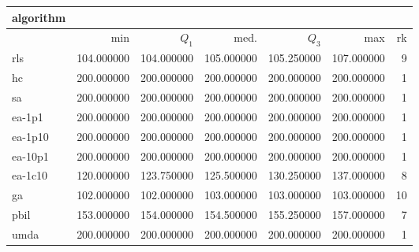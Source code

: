 \begin{tabular}{@{}l*{5}{>{{}}N{3}{0}}>{{}}N{2}{0}@{}}
\toprule
{algorithm} &  \\
\midrule
& {min} & {$Q_1$} & {med.} & {$Q_3$} & {max} & {rk}\\
\midrule
rls & 104.000000 & 104.000000 & 105.000000 & 105.250000 & 107.000000 & 9\\
hc & {\color{blue}} 200.000000 & {\color{blue}} 200.000000 & {\color{blue}} 200.000000 & {\color{blue}} 200.000000 & {\color{blue}} 200.000000 & 1\\
sa & {\color{blue}} 200.000000 & {\color{blue}} 200.000000 & {\color{blue}} 200.000000 & {\color{blue}} 200.000000 & {\color{blue}} 200.000000 & 1\\
ea-1p1 & {\color{blue}} 200.000000 & {\color{blue}} 200.000000 & {\color{blue}} 200.000000 & {\color{blue}} 200.000000 & {\color{blue}} 200.000000 & 1\\
ea-1p10 & {\color{blue}} 200.000000 & {\color{blue}} 200.000000 & {\color{blue}} 200.000000 & {\color{blue}} 200.000000 & {\color{blue}} 200.000000 & 1\\
ea-10p1 & {\color{blue}} 200.000000 & {\color{blue}} 200.000000 & {\color{blue}} 200.000000 & {\color{blue}} 200.000000 & {\color{blue}} 200.000000 & 1\\
ea-1c10 & 120.000000 & 123.750000 & 125.500000 & 130.250000 & 137.000000 & 8\\
ga & 102.000000 & 102.000000 & 103.000000 & 103.000000 & 103.000000 & 10\\
pbil & 153.000000 & 154.000000 & 154.500000 & 155.250000 & 157.000000 & 7\\
umda & {\color{blue}} 200.000000 & {\color{blue}} 200.000000 & {\color{blue}} 200.000000 & {\color{blue}} 200.000000 & {\color{blue}} 200.000000 & 1\\
\bottomrule
\end{tabular}
